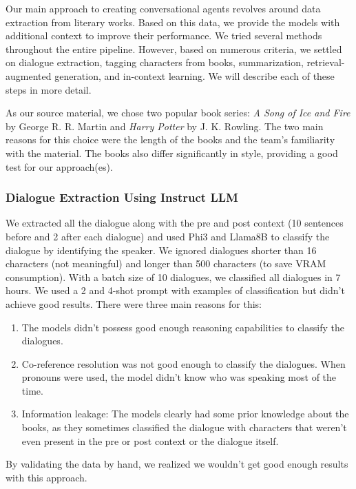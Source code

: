 \documentclass[fleqn,moreauthors,10pt]{ds_report}
\begin{document}
Our main approach to creating conversational agents revolves around data extraction from literary works. Based on this data, we provide the models with additional context to improve their performance. We tried several methods throughout the entire pipeline. However, based on numerous criteria, we settled on dialogue extraction, tagging characters from books, summarization, retrieval-augmented generation, and in-context learning. We will describe each of these steps in more detail.

As our source material, we chose two popular book series: \textit{A Song of Ice and Fire} by George R. R. Martin and \textit{Harry Potter} by J. K. Rowling. The two main reasons for this choice were the length of the books and the team's familiarity with the material. The books also differ significantly in style, providing a good test for our approach(es).

\subsubsection*{Dialogue Extraction Using Instruct LLM}

We extracted all the dialogue along with the pre and post context (10 sentences before and 2 after each dialogue) and used Phi3 and Llama8B to classify the dialogue by identifying the speaker. We ignored dialogues shorter than 16 characters (not meaningful) and longer than 500 characters (to save VRAM consumption). With a batch size of 10 dialogues, we classified all  dialogues in 7 hours. We used a 2 and 4-shot prompt with examples of classification but didn't achieve good results. There were three main reasons for this:

\begin{enumerate}
	\item The models didn't possess good enough reasoning capabilities to classify the dialogues.
	\item Co-reference resolution was not good enough to classify the dialogues. When pronouns were used, the model didn't know who was speaking most of the time.
	\item Information leakage: The models clearly had some prior knowledge about the books, as they sometimes classified the dialogue with characters that weren't even present in the pre or post context or the dialogue itself.
\end{enumerate}

By validating the data by hand, we realized we wouldn't get good enough results with this approach.
\end{document}
